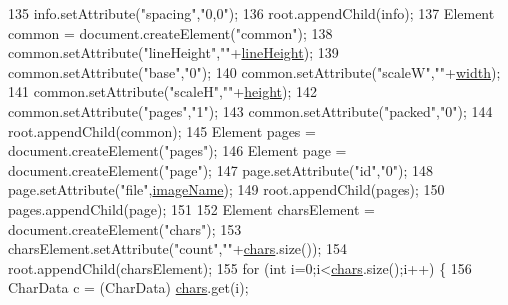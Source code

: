 \begin{DoxyCode}
135             info.setAttribute(\textcolor{stringliteral}{"spacing"},\textcolor{stringliteral}{"0,0"});
136             root.appendChild(info);
137             Element common = document.createElement(\textcolor{stringliteral}{"common"});
138             common.setAttribute(\textcolor{stringliteral}{"lineHeight"},\textcolor{stringliteral}{""}+\mbox{\hyperlink{classorg_1_1newdawn_1_1slick_1_1tools_1_1hiero_1_1_data_set_adfaf42d468a6c97ab5e478c89db021d7}{lineHeight}});
139             common.setAttribute(\textcolor{stringliteral}{"base"},\textcolor{stringliteral}{"0"});
140             common.setAttribute(\textcolor{stringliteral}{"scaleW"},\textcolor{stringliteral}{""}+\mbox{\hyperlink{classorg_1_1newdawn_1_1slick_1_1tools_1_1hiero_1_1_data_set_afbd3cb40d79ad92dd8c605d1a6a9e420}{width}});
141             common.setAttribute(\textcolor{stringliteral}{"scaleH"},\textcolor{stringliteral}{""}+\mbox{\hyperlink{classorg_1_1newdawn_1_1slick_1_1tools_1_1hiero_1_1_data_set_a4e81f554bbcc0c83a03123c0d84256c6}{height}});
142             common.setAttribute(\textcolor{stringliteral}{"pages"},\textcolor{stringliteral}{"1"});
143             common.setAttribute(\textcolor{stringliteral}{"packed"},\textcolor{stringliteral}{"0"});
144             root.appendChild(common);
145             Element pages = document.createElement(\textcolor{stringliteral}{"pages"});
146             Element page = document.createElement(\textcolor{stringliteral}{"page"});
147             page.setAttribute(\textcolor{stringliteral}{"id"},\textcolor{stringliteral}{"0"});
148             page.setAttribute(\textcolor{stringliteral}{"file"},\mbox{\hyperlink{classorg_1_1newdawn_1_1slick_1_1tools_1_1hiero_1_1_data_set_afc8adad2798f5bec23a83211af00241c}{imageName}});
149             root.appendChild(pages);
150             pages.appendChild(page);
151             
152             Element charsElement = document.createElement(\textcolor{stringliteral}{"chars"});
153             charsElement.setAttribute(\textcolor{stringliteral}{"count"},\textcolor{stringliteral}{""}+\mbox{\hyperlink{classorg_1_1newdawn_1_1slick_1_1tools_1_1hiero_1_1_data_set_a6623d34b60d062494838b664632c15a6}{chars}}.size());
154             root.appendChild(charsElement);
155             \textcolor{keywordflow}{for} (\textcolor{keywordtype}{int} i=0;i<\mbox{\hyperlink{classorg_1_1newdawn_1_1slick_1_1tools_1_1hiero_1_1_data_set_a6623d34b60d062494838b664632c15a6}{chars}}.size();i++) \{
156                 CharData c = (CharData) \mbox{\hyperlink{classorg_1_1newdawn_1_1slick_1_1tools_1_1hiero_1_1_data_set_a6623d34b60d062494838b664632c15a6}{chars}}.get(i);

\end{DoxyCode}
